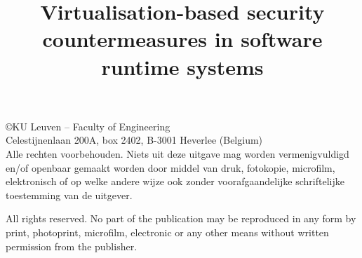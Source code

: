 %




\title{Virtualisation-based security countermeasures in software runtime systems}

\sidetitle{}





\pagestyle{empty}
\newpage
\section*{}

\vspace*{13cm}

\copyright  KU Leuven -- Faculty of Engineering \\
Celestijnenlaan 200A, box 2402, B-3001 Heverlee (Belgium) \\

\vspace*{0.3cm}
\noindent
Alle rechten voorbehouden. Niets uit deze uitgave mag worden 
vermenigvuldigd en/of openbaar gemaakt worden door middel van druk,
fotokopie, microfilm, elektronisch of op welke andere wijze ook zonder
voorafgaandelijke schriftelijke toestemming van de uitgever.

\vspace*{0.2cm}
\noindent
All rights reserved. No part of the publication may be reproduced in
any form by print, photoprint, microfilm, electronic or any other means
without written permission from the publisher.

